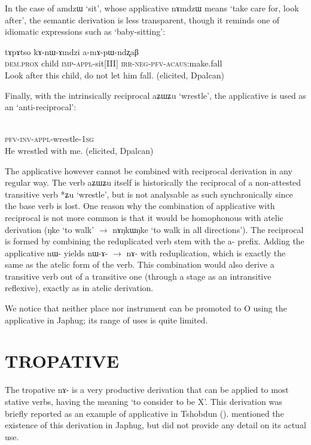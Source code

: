 \documentclass[oldfontcommands,twoside,a4paper,12pt]{article}
\newcommand{\ipa}[1]{{\phon \mbox{#1}}} %
\newcommand{\acaus}{\textsc{acaus}}
\newcommand{\appl}{\textsc{appl}}
\newcommand{\aor}{\textsc{pfv}}
\newcommand{\dem}{\textsc{dem}}
\newcommand{\imp}{\textsc{imp}}
\newcommand{\inv}{\textsc{inv}}
\newcommand{\irr}{\textsc{irr}}
\newcommand{\negat}{\textsc{neg}}
\newcommand{\pfv}{\textsc{pfv}}
\newcommand{\prox}{\textsc{prox}}
\newcommand{\sg}{\textsc{sg}}
\begin{document}
  In the case of  \ipa{amdzɯ} `sit', whose applicative \ipa{nɤmdzɯ} means `take care for, look after', the semantic derivation is less transparent, though it reminds one of idiomatic expressions such as `baby-sitting':
   \begin{exe}
   \ex 
\gll \ipa{ki} 	\ipa{tɤpɤtso} 	\ipa{kɤ-nɯ-ɤmdzi} 	\ipa{a-mɤ-pɯ-ndʐaβ}  \\
\dem{}.\prox{} child \imp{}-\appl{}-sit[III] \irr{}-\negat-\pfv{}-\acaus{}:make.fall \\
 \glt    Look after this child, do not let him fall. (elicited, Dpalcan)
   \end{exe} 


Finally, with the intrinsically reciprocal \ipa{aʑɯʑu} `wrestle', the applicative is used as an `anti-reciprocal':

   \begin{exe}
   \ex 
\gll \ipa{tɤ́-wɣ-nɯ-ɤʑɯʑu-a} 	   \\
\aor{}-\inv{}-\appl{}-wrestle-1\sg{}  \\
 \glt    He wrestled with me. (elicited, Dpalcan)
   \end{exe} 
The applicative however cannot be combined with reciprocal derivation in any regular way. The verb \ipa{aʑɯʑu} itself is historically the reciprocal of a non-attested transitive verb *\ipa{ʑu} `wrestle', but is not analysable as such synchronically since the base verb is lost. One reason why the combination of applicative with reciprocal is not more common is that   it would be homophonous with  atelic derivation (\ipa{ŋke} `to walk' $\rightarrow$ \ipa{nɤŋkɯŋke} `to walk in all directions'). The reciprocal is formed by combining the reduplicated verb stem with the \ipa{a-} prefix. Adding the applicative \ipa{nɯ-} yields \ipa{nɯ-ɤ-} $\rightarrow$  \ipa{nɤ-} with reduplication, which is exactly the same as the atelic form of the verb. This combination would also derive a transitive verb out of a transitive one (through a stage as an intransitive reflexive), exactly as in atelic derivation.

We notice that neither place nor instrument can be promoted to O using the applicative in Japhug; its range of uses is quite limited.


\section{\uppercase{tropative}} \label{sec:tropative}
 

The tropative \ipa{nɤ-}  is a very productive derivation that can be applied to most stative verbs, having the meaning `to consider to be X'.  This derivation was briefly reported as an example of applicative  in Tshobdun (\citealt[5-6]{jackson06paisheng}).  \citet{jacques12demotion, jacques12incorp}   mentioned the existence of this derivation in Japhug, but did not provide any detail on its actual use.
\end{document}
